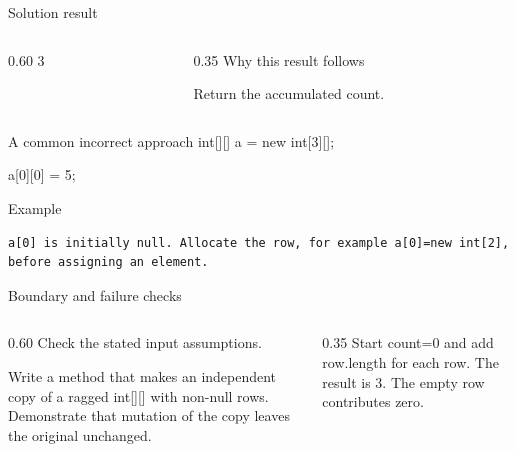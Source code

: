 \documentclass[10pt,aspectratio=169]{beamer}
\begin{document}
\begin{frame}[fragile,t]{Solution result}
\begin{columns}[T,onlytextwidth]\begin{column}{0.60\textwidth}
3
\end{column}\begin{column}{0.35\textwidth}\small
Why this result follows

Return the accumulated count.
\end{column}\end{columns}
\end{frame}

\begin{frame}[fragile,t]{A common incorrect approach}
int[][] a = new int[3][];\par a[0][0] = 5;
\vspace{1mm}\begin{block}{Example}
\begin{lstlisting}
a[0] is initially null. Allocate the row, for example a[0]=new int[2], before assigning an element.
\end{lstlisting}
\end{block}
\end{frame}

\begin{frame}[fragile,t]{Boundary and failure checks}
\begin{columns}[T,onlytextwidth]\begin{column}{0.60\textwidth}
Check the stated input assumptions.

Write a method that makes an independent copy of a ragged int[][] with non-null rows. Demonstrate that mutation of the copy leaves the original unchanged.
\end{column}\begin{column}{0.35\textwidth}\small
Start count=0 and add row.length for each row. The result is 3. The empty row contributes zero.
\end{column}\end{columns}
\end{frame}
\end{document}
